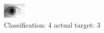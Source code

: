 \begin{figure}[h!]
\begin{center}
\includegraphics[width=0.60\columnwidth]{figures/ID1872_class_4_target_3.png}
\end{center}
\caption{ Classification: 4 actual target: 3}
\label{fig:ID1872_class_4_target_3}
\end{figure}
